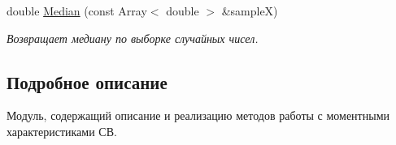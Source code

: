 \begin{DoxyCompactItemize}
\hypertarget{namespace_math_1_1_statistic_a6f485f591ba03413dc10ca85d1d3bf45}{}\label{namespace_math_1_1_statistic_a6f485f591ba03413dc10ca85d1d3bf45} 
double \hyperlink{namespace_math_1_1_statistic_a6f485f591ba03413dc10ca85d1d3bf45}{Median} (const Array$<$ double $>$ \&sampleX)
\begin{DoxyCompactList}\small\item\em Возвращает медиану по выборке случайных чисел. \end{DoxyCompactList}\end{DoxyCompactItemize}


\subsection{Подробное описание}
Модуль, содержащий описание и реализацию методов работы с моментными характеристиками СВ. 